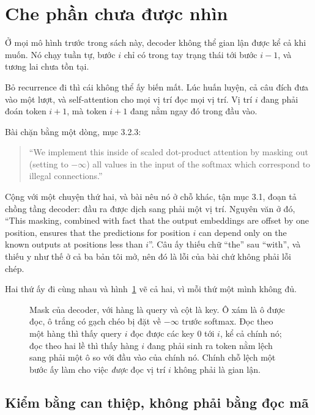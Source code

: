 \section{Che phần chưa được nhìn}
\label{sec:ch07-che}

%
Ở mọi mô hình trước trong sách này, decoder không thể gian lận được kể cả khi
muốn. Nó chạy tuần tự, bước \(i\) chỉ có trong tay trạng thái tới bước \(i-1\),
và tương lai chưa tồn tại.

Bỏ recurrence đi thì cái không thể ấy biến mất. Lúc huấn luyện, cả câu đích đưa
vào một lượt, và self-attention cho mọi vị trí đọc mọi vị trí. Vị trí \(i\) đang
phải đoán token \(i+1\), mà token \(i+1\) đang nằm ngay đó trong đầu vào.

Bài chặn bằng một dòng, mục 3.2.3:

\begin{quote}
\enquote{We implement this inside of scaled dot-product attention by masking
out (setting to \(-\infty\)) all values in the input of the softmax which
correspond to illegal connections.}
\end{quote}

Cộng với một chuyện thứ hai, và bài nêu nó ở chỗ khác, tận mục 3.1, đoạn tả
chồng tầng decoder: đầu ra được dịch sang phải một vị trí. Nguyên văn ở đó,
\enquote{This masking, combined with fact that the output embeddings are offset
by one position, ensures that the predictions for position \(i\) can depend only
on the known outputs at positions less than \(i\)}. Câu ấy thiếu chữ
\enquote{the} sau \enquote{with}, và thiếu y như thế ở cả ba bản tôi mở, nên đó
là lỗi của bài chứ không phải lỗi chép.

Hai thứ ấy đi cùng nhau và hình~\ref{fig:ch07-mask} vẽ cả hai, vì mỗi thứ một
mình không đủ.

\begin{figure}[htbp]
  \centering
  
  \caption{Mask của decoder, với hàng là query và cột là key. Ô xám là ô được
    đọc, ô trắng có gạch chéo bị đặt về \(-\infty\) trước softmax. Đọc theo một
    hàng thì
    thấy query \(i\) đọc được các key 0 tới \(i\), kể cả chính nó; đọc theo
    hai lề thì thấy hàng \(i\) đang phải sinh ra token nằm lệch sang phải một
    ô so với đầu vào của chính nó. Chính chỗ lệch một bước ấy làm cho việc
    \emph{được} đọc vị trí \(i\) không phải là gian lận.}
  \label{fig:ch07-mask}
\end{figure}

\subsection*{Kiểm bằng can thiệp, không phải bằng đọc mã}

